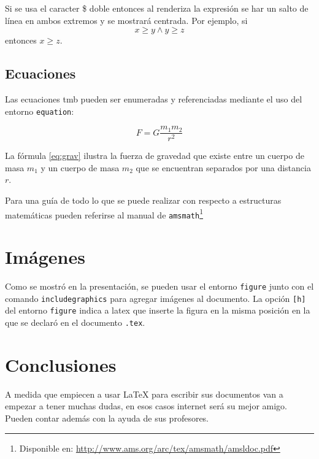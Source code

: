 \documentclass[a4paper,12pt]{article}
\begin{document}
Si se usa el caracter \$ doble entonces al renderiza la expresión se har un
salto de línea en ambos extremos y se mostrará centrada. Por ejemplo, si $$x \ge
y \wedge y \ge z$$ entonces $x \ge z$.

\subsection{Ecuaciones}\label{sub:eq}

Las ecuaciones tmb pueden ser enumeradas y referenciadas mediante el uso del
entorno \texttt{equation}:

\begin{equation}\label{eq:grav}
    F = G\frac{m_1m_2}{r^2}
\end{equation}

La fórmula \ref{eq:grav} ilustra la fuerza de gravedad que existe entre un
cuerpo de masa $m_1$ y un cuerpo de masa $m_2$ que se encuentran separados por
una distancia $r$.

Para una guía de todo lo que se puede realizar con respecto a estructuras
matemáticas pueden referirse al manual de \texttt{amsmath}\footnote{Disponible
en: \url{http://www.ams.org/arc/tex/amsmath/amsldoc.pdf}}

\section{Imágenes}\label{sec:img-and-tables}

Como se mostró en la presentación, se pueden usar el entorno \texttt{figure}
junto con el comando \texttt{includegraphics} para agregar imágenes al
documento.  La opción \texttt{[h]} del entorno \texttt{figure} indica a latex que
inserte la figura en la misma posición en la que se declaró en el documento
\texttt{.tex}.

\section{Conclusiones}\label{sec:concl}

A medida que empiecen a usar \LaTeX{} para escribir sus documentos van a empezar a
tener muchas dudas, en esos casos internet será su mejor amigo. Pueden contar
además con la ayuda de sus profesores.

\newpage

\tableofcontents

\newpage

\end{document}
